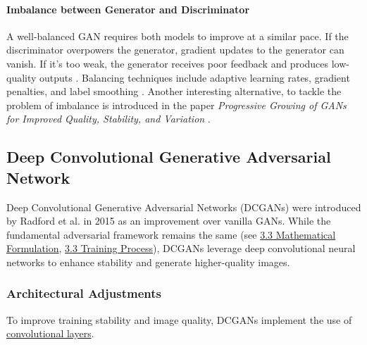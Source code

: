 \paragraph[Imbalance between Generator and Discriminator]{Imbalance between Generator and Discriminator}
A well-balanced GAN requires both models to improve at a similar pace. If the discriminator overpowers the generator, gradient updates to the generator can vanish. If it's too weak, the generator receives poor feedback and produces low-quality outputs \cite{goodfellow2014generativeadversarialnetworks}. Balancing techniques include adaptive learning rates, gradient penalties, and label smoothing \cite{Radford2015DCGAN}. Another interesting alternative, to tackle the problem of imbalance is introduced in the paper \textit{Progressive Growing of GANs for Improved Quality, Stability, and Variation} \cite{karras2018progressivegrowinggansimproved}.


\subsection[Deep Convolutional Generative Adversarial Network - DCGAN]{Deep Convolutional Generative Adversarial Network}\label{theoretical_dcgan}
Deep Convolutional Generative Adversarial Networks (DCGANs) were introduced by Radford et al. in 2015 \cite{Radford2015DCGAN} as an improvement over vanilla GANs. While the fundamental adversarial framework remains the same (see \hyperref[theoretical_gan_math]{3.3 Mathematical Formulation}, \hyperref[theoretical_gan_training]{3.3 Training Process}), DCGANs leverage deep convolutional neural networks to enhance stability and generate higher-quality images.

\subsubsection{Architectural Adjustments}\label{theorey_dcgan_architecture}
To improve training stability and image quality, DCGANs implement the use of \hyperref[theoretical_classification_conv_layers]{convolutional layers}.

